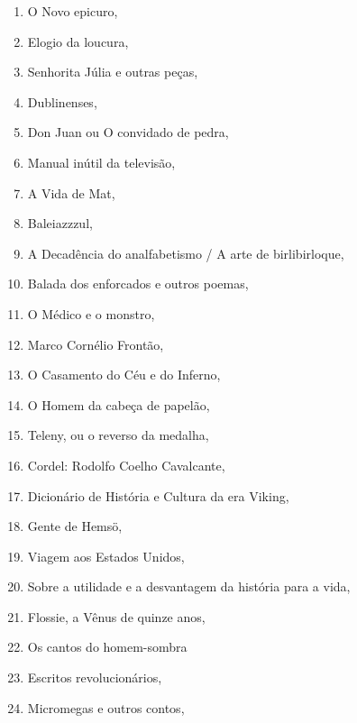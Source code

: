 \begin{multicols}{2}
\begin{enumerate}
\item O Novo epicuro, {}
\item Elogio da loucura, {}
\item Senhorita Júlia e outras peças, {}
\item Dublinenses, {}
\item Don Juan ou O convidado de pedra, {}
\item Manual inútil da televisão, {}
\item A Vida de Mat, {}
\item Baleiazzzul, {}
\item A Decadência do analfabetismo / A arte de birlibirloque, {}
\item Balada dos enforcados e outros poemas, {}
\item O Médico e o monstro, {}
\item Marco Cornélio Frontão, {}
\item O Casamento do Céu e do Inferno, {}
\item O Homem da cabeça de papelão, {}
\item Teleny, ou o reverso da medalha, {}
\item Cordel: Rodolfo Coelho Cavalcante, {}
\item Dicionário de História e Cultura da era Viking, {}
\item Gente de Hemsö, {}
\item Viagem aos Estados Unidos, {}
\item Sobre a utilidade e a desvantagem da história para a vida, {}
\item Flossie, a Vênus de quinze anos, {}
\item Os cantos do homem-sombra
\item Escritos revolucionários, {}
\item Micromegas e outros contos, {}

\end{enumerate}
\end{multicols}
